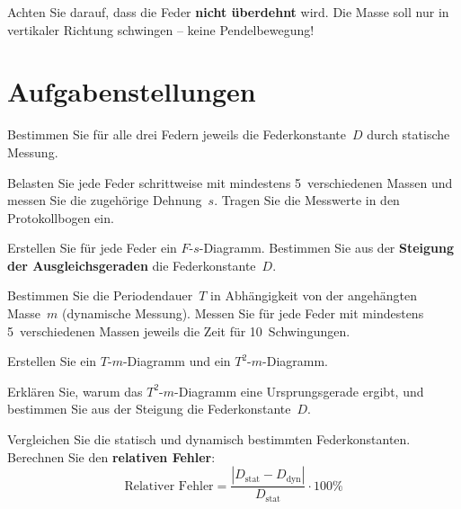 \documentclass[11pt,a4paper]{scrartcl}
\begin{document}
\begin{hilfebox}
	Achten Sie darauf, dass die Feder \textbf{nicht überdehnt} wird. Die Masse soll nur in vertikaler Richtung schwingen -- keine Pendelbewegung!
\end{hilfebox}

\section*{Aufgabenstellungen}

\begin{aufgabe}[title={\faIcon{pencil-alt} Aufgabe 1: Statische Bestimmung der Federkonstante}]
	Bestimmen Sie für alle drei Federn jeweils die Federkonstante~$D$ durch statische Messung.

	Belasten Sie jede Feder schrittweise mit mindestens 5~verschiedenen Massen und messen Sie die zugehörige Dehnung~$s$. Tragen Sie die Messwerte in den Protokollbogen ein.
\end{aufgabe}

\begin{aufgabe}[title={\faIcon{pencil-alt} Aufgabe 2: $F$-$s$-Diagramm}]
	Erstellen Sie für jede Feder ein $F$-$s$-Diagramm. Bestimmen Sie aus der \textbf{Steigung der Ausgleichsgeraden} die Federkonstante~$D$.
\end{aufgabe}

\begin{aufgabe}[title={\faIcon{pencil-alt} Aufgabe 3: Dynamische Bestimmung}]
	Bestimmen Sie die Periodendauer~$T$ in Abhängigkeit von der angehängten Masse~$m$ (dynamische Messung). Messen Sie für jede Feder mit mindestens 5~verschiedenen Massen jeweils die Zeit für 10~Schwingungen.
\end{aufgabe}

\begin{aufgabe}[title={\faIcon{pencil-alt} Aufgabe 4: $T^2$-$m$-Diagramm}]
	Erstellen Sie ein $T$-$m$-Diagramm und ein $T^2$-$m$-Diagramm.

	Erklären Sie, warum das $T^2$-$m$-Diagramm eine Ursprungsgerade ergibt, und bestimmen Sie aus der Steigung die Federkonstante~$D$.
\end{aufgabe}

\begin{aufgabe}[title={\faIcon{pencil-alt} Aufgabe 5: Vergleich}]
	Vergleichen Sie die statisch und dynamisch bestimmten Federkonstanten. Berechnen Sie den \textbf{relativen Fehler}:
	\[ \text{Relativer Fehler} = \frac{|D_{\text{stat}} - D_{\text{dyn}}|}{D_{\text{stat}}} \cdot 100\% \]
\end{aufgabe}
\end{document}
